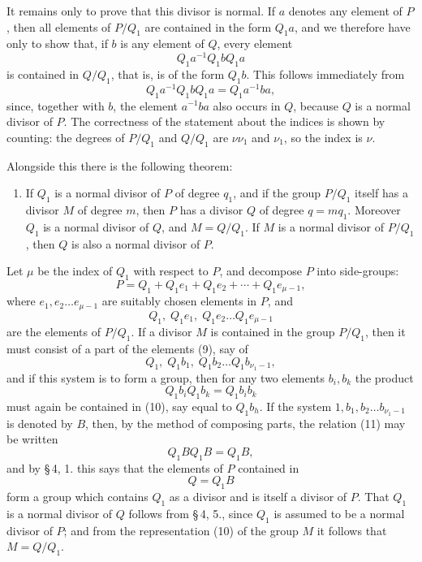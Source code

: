 \documentclass[11pt]{article}
\begin{document}
It remains only to prove that this divisor is normal. If $a$ denotes any element of $P$, then all elements of $P/Q_1$ are contained in the form $Q_1a$, and we therefore have only to show that, if $b$ is any element of $Q$, every element
\begin{equation}
Q_1a^{-1}Q_1bQ_1a
\tag{6}
\end{equation}
is contained in $Q/Q_1$, that is, is of the form $Q_1b$. This follows immediately from
\begin{equation}
Q_1a^{-1}Q_1bQ_1a=Q_1a^{-1}ba,
\tag{7}
\end{equation}
since, together with $b$, the element $a^{-1}ba$ also occurs in $Q$, because $Q$ is a normal divisor of $P$. The correctness of the statement about the indices is shown by counting: the degrees of $P/Q_1$ and $Q/Q_1$ are $\nu\nu_1$ and $\nu_1$, so the index is $\nu$.

Alongside this there is the following theorem:
\begin{enumerate}[resume,label=\arabic*.]
\item If $Q_1$ is a normal divisor of $P$ of degree $q_1$, and if the group $P/Q_1$ itself has a divisor $M$ of degree $m$, then $P$ has a divisor $Q$ of degree $q=mq_1$. Moreover $Q_1$ is a normal divisor of $Q$, and $M=Q/Q_1$. If $M$ is a normal divisor of $P/Q_1$, then $Q$ is also a normal divisor of $P$.
\end{enumerate}

Let $\mu$ be the index of $Q_1$ with respect to $P$, and decompose $P$ into side-groups:
\begin{equation}
P=Q_1+Q_1e_1+Q_1e_2+\cdots+Q_1e_{\mu-1},
\tag{8}
\end{equation}
where $e_1,e_2\ldots e_{\mu-1}$ are suitably chosen elements in $P$, and
\begin{equation}
Q_1,\;Q_1e_1,\;Q_1e_2\ldots Q_1e_{\mu-1}
\tag{9}
\end{equation}
are the elements of $P/Q_1$. If a divisor $M$ is contained in the group $P/Q_1$, then it must consist of a part of the elements (9), say of
\begin{equation}
Q_1,\;Q_1b_1,\;Q_1b_2\ldots Q_1b_{\nu_1-1},
\tag{10}
\end{equation}
and if this system is to form a group, then for any two elements $b_i,b_k$ the product
\begin{equation}
Q_1b_iQ_1b_k=Q_1b_ib_k
\tag{11}
\end{equation}
must again be contained in (10), say equal to $Q_1b_h$. If the system $1,b_1,b_2\ldots b_{\nu_1-1}$ is denoted by $B$, then, by the method of composing parts, the relation (11) may be written
\begin{equation}
Q_1BQ_1B=Q_1B,
\tag{12}
\end{equation}
and by \S\,4, 1. this says that the elements of $P$ contained in
\begin{equation}
Q=Q_1B
\tag{13}
\end{equation}
form a group which contains $Q_1$ as a divisor and is itself a divisor of $P$. That $Q_1$ is a normal divisor of $Q$ follows from \S\,4, 5., since $Q_1$ is assumed to be a normal divisor of $P$; and from the representation (10) of the group $M$ it follows that $M=Q/Q_1$.
\end{document}
